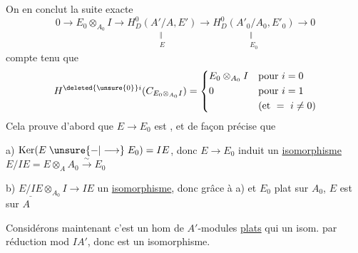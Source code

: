 On en conclut la suite exacte
\[
0\longrightarrow E_0\otimes_{A_0}I\longrightarrow
\underset{\substack{\Vert\\E}}{H_D^0(A'/A,E')}\longrightarrow
\underset{\substack{\Vert\\E_0}}{H_D^0(A'_0/A_0,E'_0)}\longrightarrow0
\]
compte tenu que
\[
H^{\deleted{\unsure{0}}i}(C_{E_0\otimes_{A_0}I})=
\left\{\begin{aligned}
&E_0\otimes_{A_0}I &&\text{pour }i=0\\
&0 &&\text{pour }i=1\\
&&&(\text{et }=\ i\ne0)
\end{aligned}\right.
\]
Cela prouve d'abord que $E\longrightarrow E_0$ est ,  et de façon précise que

a) $\operatorname{Ker}(E\mathrel{\unsure{-|\longrightarrow}} E_0)=IE$, donc $E\longrightarrow E_0$ induit un \uline{isomorphisme} $E/IE=E\otimes_A A_0\xrightarrow{\sim}E_0$

b) $\underline{E/IE}\otimes_{A_0}I\longrightarrow IE$ un \uline{isomorphisme}, donc grâce à a) et $E_0$ plat sur $A_0$, $E$ est  sur $A$

Considérons maintenant  
c'est un hom de $A'$-modules \uline{plats} qui   un isom. par réduction mod $IA'$, donc est un isomorphisme.
